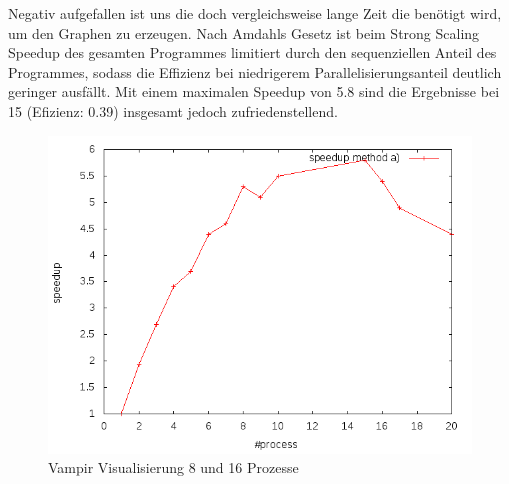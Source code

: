 \documentclass[paper=A4,pagesize=auto,12pt,headinclude=true,footinclude=true,BCOR=0mm,DIV=calc]{scrartcl}
\begin{document}
	Negativ aufgefallen ist uns die doch vergleichsweise lange Zeit die benötigt wird, um den Graphen zu erzeugen. Nach Amdahls Gesetz \cite{PaPoBuch} ist beim Strong Scaling Speedup des gesamten Programmes limitiert durch den sequenziellen Anteil des Programmes, sodass die Effizienz bei niedrigerem Parallelisierungsanteil deutlich geringer ausfällt. Mit einem maximalen Speedup von 5.8 sind die Ergebnisse bei 15 (Efizienz: 0.39) insgesamt jedoch zufriedenstellend.
		\label{speedUpA}
		\begin{figure}[H]
			\includegraphics[scale = 0.55]{Prasentation/speedupPa.png}
			\caption{Vampir Visualisierung 8 und 16 Prozesse}
		\end{figure}
	
\end{document}
